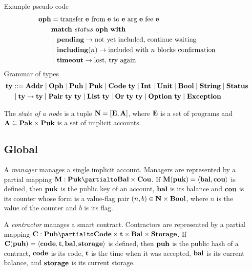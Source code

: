 \documentclass[a4paper]{llncs}
\begin{document}
Example pseudo code
\begin{align*}
  \OPH &=  \TRANSFER[\EXPR]\EXPR\EXPR\EXPR\EXPR \\
       & \MATCH\ {status\ \OPH}\ \WITH \\
       & \mid \STATUSPENDING \to \textrm{not yet included, continue waiting} \\
       & \mid \STATUSINCLUDING (n) \to \textrm{included with $n$
         blocks confirmation}\\
       & \mid \STATUSTIMEOUT \to \textrm{lost, try again}
\end{align*}
Grammar of types
\begin{align*}
  \TYPE & ::= \TADDR \mid \TOPH \mid \TPUH \mid \TPUK \mid \TCODE\ \TYPE \mid
          \TINT \mid \TUNIT \mid \TBOOL \mid \TSTRING \mid \TSTATUS \\
  & \mid \TYPE\to\TYPE \mid \TPAIR\ \TYPE\ \TYPE \mid \TLIST\ \TYPE
    \mid \TSUM\ \TYPE\ \TYPE \mid \TOPTION\ \TYPE \mid \TEXCEPTION
\end{align*}

\begin{definition}%
  The \emph{state of a node} is a tuple
  $\NODE = [ \EXPRS, \ACCOUNTS
  ]$, where $\EXPRS$ is a
  set of programs and $\ACCOUNTS \subseteq \TPAK \times \TPUK$  is a set of
  implicit accounts.
\end{definition}


\subsection{Global}
\label{sec:global}



\begin{definition}%
A \emph{manager} manages a single implicit account. Managers are
represented by a partial mapping $\MANAGERS : \TPUK \partialto \TBAL
\times \TCOU$. If $\MANAGERS (\PUK) = \Angle{\BAL, \COU}$ is defined, then  $\PUK$ is the
public key of an account, $\BAL$ is its
balance and $\COU$ is its counter whose form is a value-flag pair
$(n,b) \in \Nat\times\TBOOL$, where $n$ is the value of the counter
and ${b}$ is its flag.   
\end{definition}

\begin{definition}%
  A \emph{contractor} manages a smart contract. Contractors are
  represented by a partial mapping $\CONTRACTORS : \TPUH \partialto
  \TCODE \times \TIME  \times \TBAL \times  \TSTORAGE$. If $\CONTRACTORS (\PUH) = \langle
  \CODE, \TIME, \BAL, \STORAGE \rangle $ is defined, then $\PUH$ is the
  public hash of a contract,
  $\CODE$ is its  code,
  $\TIME$ is the time when it was accepted,
  $\BAL$ is its current balance,
  and $\STORAGE$ is its current storage.
\end{definition}
\end{document}
